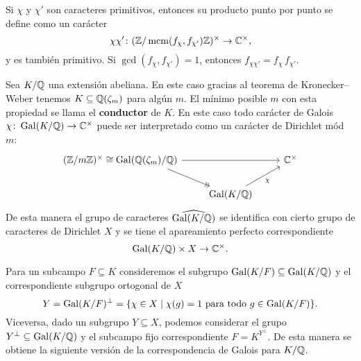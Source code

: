 Si $\chi$ y $\chi'$ son caracteres primitivos, entonces su producto punto por
punto se define como un carácter
$$\chi\chi'\colon (\mathbb{Z}/\operatorname{mcm} (f_\chi,f_{\chi'})\mathbb{Z})^\times \to \mathbb{C}^\times,$$
y es también primitivo. Si $\gcd (f_\chi,f_{\chi'}) = 1$, entonces
$f_{\chi\chi'} = f_\chi\,f_{\chi'}$.

Sea $K/\mathbb{Q}$ una extensión abeliana. En este caso gracias al teorema de
Kronecker--Weber tenemos ${K \subseteq \mathbb{Q} (\zeta_m)}$ para algún $m$.
El mínimo posible $m$ con esta propiedad se llama el \textbf{conductor}
de $K$. En este caso todo carácter de Galois
$\chi\colon \operatorname{Gal} (K/\mathbb{Q}) \to \mathbb{C}^\times$ puede ser interpretado como un
carácter de Dirichlet mód $m$:
\[ \begin{tikzcd}
  (\ZZ/m\ZZ)^\times &[-3em] \cong &[-3em] \Gal (\QQ (\zeta_m)/\QQ)\ar{rr}\ar[->>]{dr} & & \CC^\times \\
  & & & \Gal (K/\QQ)\ar{ur}[swap]{\chi}
  \end{tikzcd} \]
De esta manera el grupo de caracteres $\widehat{\operatorname{Gal} (K/\mathbb{Q})}$ se identifica con
cierto grupo de caracteres de Dirichlet $X$ y se tiene el apareamiento perfecto
correspondiente
$$\operatorname{Gal} (K/\mathbb{Q}) \times X \to \mathbb{C}^\times.$$

Para un subcampo $F\subseteq K$ consideremos el subgrupo
$\operatorname{Gal} (K/F) \subseteq \operatorname{Gal} (K/\mathbb{Q})$ y el correspondiente subgrupo ortogonal
de $X$
$$Y = \operatorname{Gal} (K/F)^\perp = \{ \chi \in X \mid \chi (g) = 1 \text{ para todo } g \in \operatorname{Gal} (K/F) \}.$$
Viceversa, dado un subgrupo $Y \subseteq X$, podemos considerar el grupo
$Y^\perp \subseteq \operatorname{Gal} (K/\mathbb{Q})$ y el subcampo fijo correspondiente
$F = K^{Y^\perp}$. De esta manera se obtiene la siguiente versión de
la correspondencia de Galois para $K/\mathbb{Q}$.

